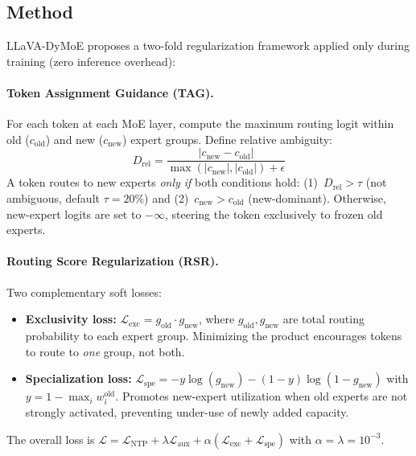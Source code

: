 \documentclass[11pt]{article}
\begin{document}
\subsection{Method}

LLaVA-DyMoE proposes a two-fold regularization framework applied only during training (zero inference overhead):

\paragraph{Token Assignment Guidance (TAG).}
For each token at each MoE layer, compute the maximum routing logit within old ($c_{\mathrm{old}}$) and new ($c_{\mathrm{new}}$) expert groups. Define relative ambiguity:
\begin{equation}
D_{\mathrm{rel}} = \frac{|c_{\mathrm{new}} - c_{\mathrm{old}}|}{\max(|c_{\mathrm{new}}|, |c_{\mathrm{old}}|) + \epsilon}
\end{equation}
A token routes to new experts \textit{only if} both conditions hold: (1)~$D_{\mathrm{rel}} > \tau$ (not ambiguous, default $\tau = 20\%$) and (2)~$c_{\mathrm{new}} > c_{\mathrm{old}}$ (new-dominant). Otherwise, new-expert logits are set to $-\infty$, steering the token exclusively to frozen old experts.

\paragraph{Routing Score Regularization (RSR).}
Two complementary soft losses:
\begin{itemize}
    \item \textbf{Exclusivity loss:} $\mathcal{L}_{\mathrm{exc}} = g_{\mathrm{old}} \cdot g_{\mathrm{new}}$, where $g_{\mathrm{old}}, g_{\mathrm{new}}$ are total routing probability to each expert group. Minimizing the product encourages tokens to route to \textit{one} group, not both.
    \item \textbf{Specialization loss:} $\mathcal{L}_{\mathrm{spe}} = -y \log(g_{\mathrm{new}}) - (1-y)\log(1 - g_{\mathrm{new}})$ with $y = 1 - \max_i w_i^{\mathrm{old}}$. Promotes new-expert utilization when old experts are not strongly activated, preventing under-use of newly added capacity.
\end{itemize}

The overall loss is $\mathcal{L} = \mathcal{L}_{\mathrm{NTP}} + \lambda \mathcal{L}_{\mathrm{aux}} + \alpha(\mathcal{L}_{\mathrm{exc}} + \mathcal{L}_{\mathrm{spe}})$ with $\alpha = \lambda = 10^{-3}$.
\end{document}
